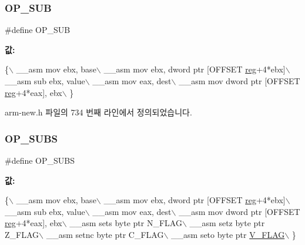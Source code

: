 \subsubsection{\texorpdfstring{O\+P\+\_\+\+S\+UB}{OP\_SUB}\hspace{0.1cm}{\footnotesize\ttfamily [2/2]}}
{\footnotesize\ttfamily \#define O\+P\+\_\+\+S\+UB}

{\bfseries 값\+:}
\begin{DoxyCode}
\{\(\backslash\)
        \_\_asm mov ebx, base\(\backslash\)
        \_\_asm mov ebx, dword ptr [OFFSET \mbox{\hyperlink{_g_b_a_8h_ae29faba89509024ffd1a292badcedf2d}{reg}}+4*ebx]\(\backslash\)
        \_\_asm sub ebx, value\(\backslash\)
        \_\_asm mov eax, dest\(\backslash\)
        \_\_asm mov dword ptr [OFFSET \mbox{\hyperlink{_g_b_a_8h_ae29faba89509024ffd1a292badcedf2d}{reg}}+4*eax], ebx\(\backslash\)
      \}
\end{DoxyCode}


arm-\/new.\+h 파일의 734 번째 라인에서 정의되었습니다.

\mbox{\label{_g_b_a_8cpp_af7ad443f7a99539feae657dfff0db8f6}} 
\subsubsection{\texorpdfstring{O\+P\+\_\+\+S\+U\+BS}{OP\_SUBS}\hspace{0.1cm}{\footnotesize\ttfamily [1/2]}}
{\footnotesize\ttfamily \#define O\+P\+\_\+\+S\+U\+BS}

{\bfseries 값\+:}
\begin{DoxyCode}
\{\(\backslash\)
        \_\_asm mov ebx, base\(\backslash\)
        \_\_asm mov ebx, dword ptr [OFFSET \mbox{\hyperlink{_g_b_a_8h_ae29faba89509024ffd1a292badcedf2d}{reg}}+4*ebx]\(\backslash\)
        \_\_asm sub ebx, value\(\backslash\)
        \_\_asm mov eax, dest\(\backslash\)
        \_\_asm mov dword ptr [OFFSET \mbox{\hyperlink{_g_b_a_8h_ae29faba89509024ffd1a292badcedf2d}{reg}}+4*eax], ebx\(\backslash\)
        \_\_asm sets byte ptr N\_FLAG\(\backslash\)
        \_\_asm setz byte ptr Z\_FLAG\(\backslash\)
        \_\_asm setnc byte ptr C\_FLAG\(\backslash\)
        \_\_asm seto byte ptr \mbox{\hyperlink{_g_b_a_8h_a11a0e7b14a93be5eb2720b0151900919}{V\_FLAG}}\(\backslash\)
      \}
\end{DoxyCode}
\mbox{\label{arm-new_8h_af7ad443f7a99539feae657dfff0db8f6}} 

